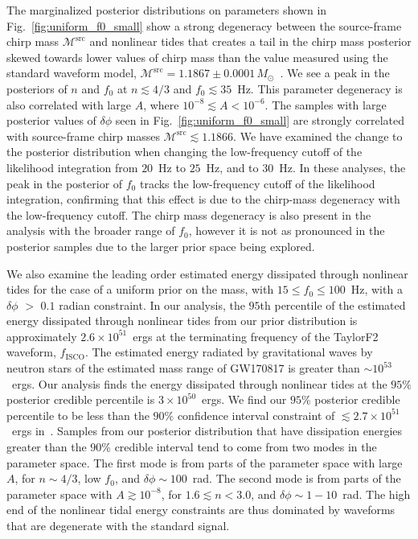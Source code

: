 The marginalized posterior distributions on parameters shown in Fig.~\ref{fig:uniform_f0_small} show a strong degeneracy between the source-frame chirp mass $\mathcal{M}^\textrm{src}$ and nonlinear tides that creates a tail in the chirp mass posterior skewed towards lower values of chirp mass than the value measured using the standard waveform model, $\mathcal{M}^\textrm{src} = 1.1867\pm0.0001\, M_\odot$~\citep{de2018tidal}. We see a peak in the posteriors of $n$ and $f_0$ at $n \lesssim 4/3$ and $f_0 \lesssim 35$~Hz. This parameter degeneracy is also correlated with large $A$, where $10^{-8} \lesssim A < 10^{-6}$. The samples with large posterior values of $\delta\phi$ seen in Fig.~\ref{fig:uniform_f0_small} are strongly correlated with source-frame chirp masses $\mathcal{M}^\textrm{src} \lesssim 1.1866.$ We have examined the change to the posterior distribution when changing the low-frequency cutoff of the likelihood integration from $20$~Hz to $25$~Hz, and to $30$~Hz. In these analyses, the peak in the posterior of $f_0$ tracks the low-frequency cutoff of the likelihood integration, confirming that this effect is due to the chirp-mass degeneracy with the low-frequency cutoff. The chirp mass degeneracy is also present in the analysis with the broader range of $f_0$, however it is not as pronounced in the posterior samples due to the larger prior space being explored.

We also examine the leading order estimated energy dissipated through nonlinear tides for the case of a uniform prior on the mass, with $15 \leq f_0 \leq 100$~Hz, with a $\delta \phi$ $>$ $0.1$ radian constraint. In our analysis, the $95$th percentile of the estimated energy dissipated through nonlinear tides from our prior distribution is approximately $2.6 \times 10^{51}$~ergs at the terminating frequency of the TaylorF2 waveform, $f_\mathrm{ISCO}$. The estimated energy radiated by gravitational waves by neutron stars of the estimated mass range of GW170817 is greater than $\sim 10^{53}$~ergs. Our analysis finds the energy dissipated through nonlinear tides at the $95\%$ posterior credible percentile is $3 \times 10^{50}$~ergs. We find our $95\%$ posterior credible percentile to be less than the $90\%$ confidence interval constraint of $\lesssim 2.7 \times 10^{51}$~ergs in~\cite{abbott2019constraining}. Samples from our posterior distribution that have dissipation energies greater than the $90$\% credible interval tend to come from two modes in the parameter space. The first mode is from parts of the parameter space with large $A$, for $n \sim 4/3$, low $f_0$, and $\delta \phi \sim 100$~rad. The second mode is from parts of the parameter space with $A \gtrsim 10^{-8}$, for $1.6 \lesssim n < 3.0$, and $\delta \phi \sim 1-10$~rad. The high end of the nonlinear tidal energy constraints are thus dominated by waveforms that are degenerate with the standard signal.

